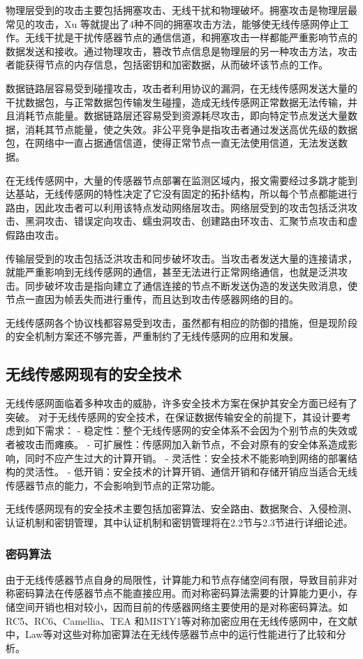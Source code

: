 物理层受到的攻击主要包括拥塞攻击、无线干扰和物理破坏。拥塞攻击是物理层最常见的攻击，Xu 等就提出了4种不同的拥塞攻击方法，能够使无线传感网停止工作。无线干扰是干扰传感器节点的通信信道，和拥塞攻击一样都能严重影响节点的数据发送和接收。通过物理攻击，篡改节点信息是物理层的另一种攻击方法，攻击者能获得节点的内存信息，包括密钥和加密数据，从而破坏该节点的工作。

数据链路层容易受到碰撞攻击，攻击者利用协议的漏洞，在无线传感网发送大量的干扰数据包，与正常数据包传输发生碰撞，造成无线传感网正常数据无法传输，并且消耗节点能量。数据链路层还容易受到资源耗尽攻击，即向特定节点发送大量数据，消耗其节点能量，使之失效。非公平竞争是指攻击者通过发送高优先级的数据包，在网络中一直占据通信信道，使得正常节点一直无法使用信道，无法发送数据。

在无线传感网中，大量的传感器节点部署在监测区域内，报文需要经过多跳才能到达基站，无线传感网的特性决定了它没有固定的拓扑结构，所以每个节点都能进行路由，因此攻击者可以利用该特点发动网络层攻击。网络层受到的攻击包括泛洪攻击、黑洞攻击、错误定向攻击、蠕虫洞攻击、创建路由环攻击、汇聚节点攻击和虚假路由攻击。

传输层受到的攻击包括泛洪攻击和同步破坏攻击。当攻击者发送大量的连接请求，就能严重影响到无线传感网的通信，甚至无法进行正常网络通信，也就是泛洪攻击。同步破坏攻击是指向建立了通信连接的节点不断发送伪造的发送失败消息，使节点一直因为帧丢失而进行重传，而且达到攻击传感器网络的目的。

无线传感网各个协议栈都容易受到攻击，虽然都有相应的防御的措施，但是现阶段的安全机制方案还不够完善，严重制约了无线传感网的应用和发展。


\subsection{无线传感网现有的安全技术}

无线传感网面临着多种攻击的威胁，许多安全技术方案在保护其安全方面已经有了突破。
对于无线传感网的安全技术，在保证数据传输安全的前提下，其设计要考虑到如下需求：
- 稳定性：整个无线传感网的安全体系不会因为个别节点的失效或者被攻击而瘫痪。
- 可扩展性：传感网加入新节点，不会对原有的安全体系造成影响，同时不应产生过大的计算开销。
- 灵活性：安全技术不能影响到网络的部署结构的灵活性。
- 低开销：安全技术的计算开销、通信开销和存储开销应当适合无线传感器节点的能力，不会影响到节点的正常功能。

无线传感网现有的安全技术主要包括加密算法、安全路由、数据聚合、入侵检测、认证机制和密钥管理，其中认证机制和密钥管理将在2.2节与2.3节进行详细论述。

\subsubsection{密码算法}
由于无线传感器节点自身的局限性，计算能力和节点存储空间有限，导致目前非对称密码算法在传感器节点不能直接应用。而对称密码算法需要的计算能力更小，存储空间开销也相对较小，因而目前的传感器网络主要使用的是对称密码算法。如RC5、RC6、Camellia、TEA 和MISTY1等对称加密应用在无线传感网中，在文献\cite{c1:encryptionCompare}中，Law等对这些对称加密算法在无线传感器节点中的运行性能进行了比较和分析。

